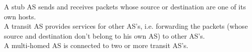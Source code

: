 A stub AS sends and receives packets whose source or destination are one of its own hosts. \\
A transit AS provides services for other AS's, i.e. forwarding the packets (whose source and destination don't belong to his own AS) to other AS's. \\
A multi-homed AS is connected to two or more transit AS's.